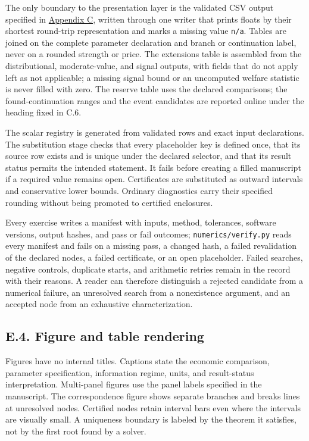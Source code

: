 \documentclass[
  11pt,
]{article}
\newcounter{none} %
\begin{document}
The only boundary to the presentation layer is the validated CSV output
specified in \hyperref[oa-c]{Appendix C}, written through one writer
that prints floats by their shortest round-trip representation and marks
a missing value \texttt{n/a}. Tables are joined on the complete
parameter declaration and branch or continuation label, never on a
rounded strength or price. The extensions table is assembled from the
distributional, moderate-value, and signal outputs, with fields that do
not apply left as not applicable; a missing signal bound or an
uncomputed welfare statistic is never filled with zero. The reserve
table uses the declared comparisons; the found-continuation ranges and
the event candidates are reported online under the heading fixed in C.6.

The scalar registry is generated from validated rows and exact input
declarations. The substitution stage checks that every placeholder key
is defined once, that its source row exists and is unique under the
declared selector, and that its result status permits the intended
statement. It fails before creating a filled manuscript if a required
value remains open. Certificates are substituted as outward intervals
and conservative lower bounds. Ordinary diagnostics carry their
specified rounding without being promoted to certified enclosures.

Every exercise writes a manifest with inputs, method, tolerances,
software versions, output hashes, and pass or fail outcomes;
\texttt{numerics/verify.py} reads every manifest and fails on a missing
pass, a changed hash, a failed revalidation of the declared nodes, a
failed certificate, or an open placeholder. Failed searches, negative
controls, duplicate starts, and arithmetic retries remain in the record
with their reasons. A reader can therefore distinguish a rejected
candidate from a numerical failure, an unresolved search from a
nonexistence argument, and an accepted node from an exhaustive
characterization.

\subsection{E.4. Figure and table rendering}\label{oa-e-rendering}

Figures have no internal titles. Captions state the economic comparison,
parameter specification, information regime, units, and result-status
interpretation. Multi-panel figures use the panel labels specified in
the manuscript. The correspondence figure shows separate branches and
breaks lines at unresolved nodes. Certified nodes retain interval bars
even where the intervals are visually small. A uniqueness boundary is
labeled by the theorem it satisfies, not by the first root found by a
solver.
\end{document}
